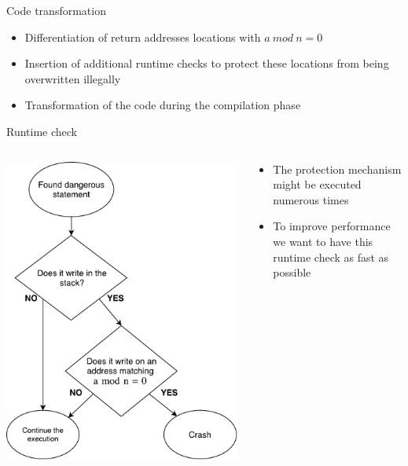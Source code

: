 \documentclass{beamer}
\begin{document}
\begin{frame}[c]{Code transformation}
	\begin{itemize}\itemsep20pt
		\item Differentiation of return addresses locations with $a~mod~n=0$
		\item Insertion of additional runtime checks to protect these locations from being overwritten illegally
		\item Transformation of the code during the compilation phase
	\end{itemize}
\end{frame}

\begin{frame}[c]{Runtime check}
	\begin{columns}
		\begin{column}{0.5\textwidth}
   			\includegraphics[height=0.85\textheight]{images/runtime_check.pdf}
		\end{column}
		\begin{column}{0.5\textwidth}
			\begin{itemize}
				\item The protection mechanism might be executed numerous times
				\item To improve performance we want to have this runtime check as fast as possible
			\end{itemize}
		\end{column}
	\end{columns}
\end{frame}
\end{document}
